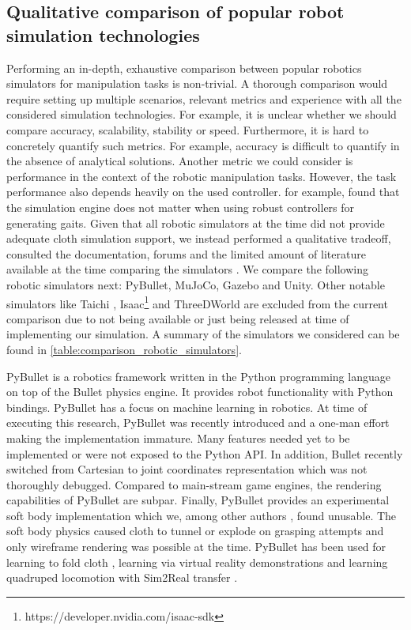 \documentclass[\home/main.tex]{subfiles}
\begin{document}
\subsection{Qualitative comparison of popular robot simulation technologies}
Performing an in-depth, exhaustive comparison between popular robotics simulators for manipulation tasks is non-trivial. A thorough comparison would require setting up multiple scenarios, relevant metrics and experience with all the considered simulation technologies. For example, it is unclear whether we should compare accuracy, scalability, stability or speed. Furthermore, it is hard to concretely quantify such metrics. For example, accuracy is difficult to quantify in the absence of analytical solutions.
Another metric we could consider is performance in the context of the robotic manipulation tasks. However, the task performance also depends heavily on the used controller. \textcite{Giovanni2011} for example, found that the simulation engine does not matter when using robust controllers for generating gaits.
Given that all robotic simulators at the time did not provide adequate cloth simulation support, we instead performed a qualitative tradeoff, consulted the documentation, forums and the limited amount of literature available at the time comparing the simulators \autocite{staranowicz2011survey,Erez2015}. We compare the following robotic simulators next: PyBullet, MuJoCo, Gazebo and Unity. Other notable simulators like Taichi \autocite{hu2019taichi}, Isaac\footnote{https://developer.nvidia.com/isaac-sdk} and ThreeDWorld \autocite{gan2021threedworld} are excluded from the current comparison due to not being available or just being released at time of implementing our simulation. A summary of the simulators we considered can be found in \cref{table:comparison_robotic_simulators}.

PyBullet is a robotics framework written in the Python programming language on top of the Bullet physics engine. It provides robot functionality with Python bindings. PyBullet has a focus on machine learning in robotics. At time of executing this research, PyBullet was recently introduced and a one-man effort making the implementation immature. Many features needed yet to be implemented or were not exposed to the Python API. In addition, Bullet recently switched from Cartesian to joint coordinates representation which was not thoroughly debugged. Compared to main-stream game engines, the rendering capabilities of PyBullet are subpar. Finally, PyBullet provides an experimental soft body implementation which we, among other authors \autocite{Matas2018, seita2021learning}, found unusable. The soft body physics caused cloth to tunnel or explode on grasping attempts and only wireframe rendering was possible at the time. PyBullet has been used for learning to fold cloth \autocite{Matas2018}, learning via virtual reality demonstrations \autocite{mahjourian2019hierarchical} and learning quadruped locomotion with Sim2Real transfer \autocite{tan2018simtoreal}.
\end{document}

